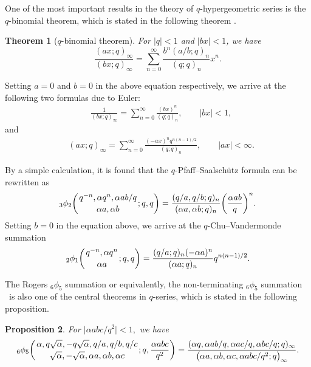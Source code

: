 \documentclass[10pt,a4paper]{amsart}
\numberwithin{equation}{section}
\newtheorem{Theorem}{Theorem}[section]
\newtheorem{Proposition}[Theorem]{Proposition}
 { \theoremstyle{definition}
\newtheorem{Definition}[Theorem]{Definition}
\newtheorem{Note}[Theorem]{Note}
\newtheorem{Example}[Theorem]{Example}
\newtheorem{Remark}[Theorem]{Remark} }
\begin{document}
One of the most important results in the theory of $q$-hypergeometric series is the $q$-binomial theorem, which is stated in the following theorem \cite[p.~488]{AAR1999}.

\begin{Theorem}[$q$-binomial theorem] %
For $|q|<1$ and $|bx|<1$, we have
	\begin{equation*}
		\frac{(ax; q)_\infty}{(bx; q)_\infty}
		=\sum_{n=0}^\infty \frac{b^n (a/b; q)_n}{(q; q)_n} x^n.
	\end{equation*}
\end{Theorem}
Setting $a=0$ and $b=0$ in the above equation respectively, we arrive at the following two formulas due to Euler:
\begin{align*}%
	&\frac{1}{(bx; q)_\infty}=\sum_{n=0}^\infty \frac{(bx)^n}{(q; q)_n},\qquad |bx|<1,
\end{align*}
and
\begin{align*}
	&(ax; q)_\infty=\sum_{n=0}^\infty \frac{(-ax)^n q^{n(n-1)/2}}{(q; q)_n}, \qquad |ax|<\infty. %
\end{align*}

By a simple calculation, it is found that the $q$-Pfaff--Saalsch\"{u}tz formula \cite[equation~(1.7.2)]{Gas+Rah} can be rewritten as
\begin{equation}\label{qpfaff}
{_3\phi_2}\biggl({{q^{-n}, \alpha q^n, \alpha ab/q}\atop{\alpha a, \alpha b}}; q, q\biggr)=\frac{(q/a, q/b; q)_n}{(\alpha a, \alpha b; q)_n}
\biggl(\frac{\alpha ab}{q}\biggr)^n.
\end{equation}
Setting $b=0$ in the equation above, we arrive at the $q$-Chu--Vandermonde summation \cite[equa\-tion~(1.5.3)]{Gas+Rah}
\begin{equation}\label{qchu-van}
	{_2\phi_1}\biggl({{q^{-n}, \alpha q^n}\atop{\alpha a}}; q, q\biggr)=\frac{(q/a; q)_n (-\alpha a)^n}{(\alpha a; q)_n} q^{n(n-1)/2}.	
\end{equation}

The Rogers $_6\phi_5$ summation or equivalently, the non-terminating $_6\phi_5$ summation \cite[p.~44]{Gas+Rah}~is also one of the central theorems in $q$-series, which is stated in the following proposition.
\begin{Proposition} \label{rogersthm} For $\bigl|\alpha abc/q^2\bigr|<1,$ we have
	\begin{align*}
		{_6 \phi_5} \biggl({{\alpha, q\sqrt{\alpha}, -q\sqrt{\alpha}, q/a, q/b, q/c}
			\atop{\sqrt{\alpha}, -\sqrt{\alpha},\alpha a, \alpha b, \alpha c}}; q, \frac{\alpha abc}{q^2}\biggr)
		=\frac{(\alpha q, \alpha ab/q, \alpha ac/q, \alpha bc/q; q)_\infty}
		{\bigl(\alpha a, \alpha b, \alpha c, \alpha abc/q^2; q\bigr)_\infty}.
	\end{align*}
\end{Proposition}
\end{document}
